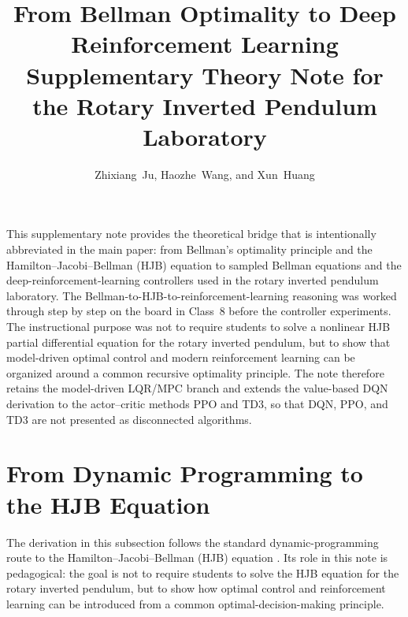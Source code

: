 \documentclass[11pt]{article}
\title{From Bellman Optimality to Deep Reinforcement Learning\\\large Supplementary Theory Note for the Rotary Inverted Pendulum Laboratory}
\author{Zhixiang~Ju, Haozhe~Wang, and Xun~Huang}
\date{}
\begin{document}
\maketitle

\noindent
This supplementary note provides the theoretical bridge that is intentionally abbreviated in the main paper: from Bellman's optimality principle and the Hamilton--Jacobi--Bellman (HJB) equation to sampled Bellman equations and the deep-reinforcement-learning controllers used in the rotary inverted pendulum laboratory. The Bellman-to-HJB-to-reinforcement-learning reasoning was worked through step by step on the board in Class~8 before the controller experiments. The instructional purpose was not to require students to solve a nonlinear HJB partial differential equation for the rotary inverted pendulum, but to show that model-driven optimal control and modern reinforcement learning can be organized around a common recursive optimality principle. The note therefore retains the model-driven LQR/MPC branch and extends the value-based DQN derivation to the actor--critic methods PPO and TD3, so that DQN, PPO, and TD3 are not presented as disconnected algorithms.

\renewcommand{\thesection}{\Alph{section}}

\section{From Dynamic Programming to the HJB Equation}

The derivation in this subsection follows the standard dynamic-programming route to the Hamilton--Jacobi--Bellman (HJB) equation \cite{bertsekas2017dynamic,liberzon2012calculus,kirk2004optimal}. Its role in this note is pedagogical: the goal is not to require students to solve the HJB equation for the rotary inverted pendulum, but to show how optimal control and reinforcement learning can be introduced from a common optimal-decision-making principle.
\end{document}
